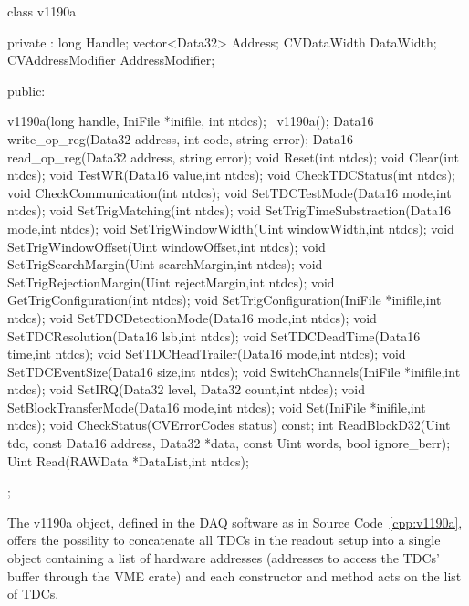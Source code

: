 	\begin{code}
    \begin{cppcode}
class v1190a
{
 private :
    long              Handle;
    vector<Data32>    Address;
    CVDataWidth       DataWidth;
    CVAddressModifier AddressModifier;

 public:

    v1190a(long handle, IniFile *inifile, int ntdcs);
    ~v1190a();
    Data16 write_op_reg(Data32 address, int code, string error);
    Data16 read_op_reg(Data32 address, string error);
    void   Reset(int ntdcs);
    void   Clear(int ntdcs);
    void   TestWR(Data16 value,int ntdcs);
    void   CheckTDCStatus(int ntdcs);
    void   CheckCommunication(int ntdcs);
    void   SetTDCTestMode(Data16 mode,int ntdcs);
    void   SetTrigMatching(int ntdcs);
    void   SetTrigTimeSubstraction(Data16 mode,int ntdcs);
    void   SetTrigWindowWidth(Uint windowWidth,int ntdcs);
    void   SetTrigWindowOffset(Uint windowOffset,int ntdcs);
    void   SetTrigSearchMargin(Uint searchMargin,int ntdcs);
    void   SetTrigRejectionMargin(Uint rejectMargin,int ntdcs);
    void   GetTrigConfiguration(int ntdcs);
    void   SetTrigConfiguration(IniFile *inifile,int ntdcs);
    void   SetTDCDetectionMode(Data16 mode,int ntdcs);
    void   SetTDCResolution(Data16 lsb,int ntdcs);
    void   SetTDCDeadTime(Data16 time,int ntdcs);
    void   SetTDCHeadTrailer(Data16 mode,int ntdcs);
    void   SetTDCEventSize(Data16 size,int ntdcs);
    void   SwitchChannels(IniFile *inifile,int ntdcs);
    void   SetIRQ(Data32 level, Data32 count,int ntdcs);
    void   SetBlockTransferMode(Data16 mode,int ntdcs);
    void   Set(IniFile *inifile,int ntdcs);
    void   CheckStatus(CVErrorCodes status) const;
    int    ReadBlockD32(Uint tdc, const Data16 address,
               Data32 *data, const Uint words, bool ignore_berr);
    Uint   Read(RAWData *DataList,int ntdcs);
};
    \end{cppcode}
	\label{cpp:v1190a}
	\vspace{5mm}
    \end{code}
	
	The v1190a object, defined in the DAQ software as in Source Code~\ref{cpp:v1190a}, offers the possility to concatenate all TDCs in the readout setup into a single object containing a list of hardware addresses (addresses to access the TDCs' buffer through the VME crate) and each constructor and method acts on the list of TDCs.\\
	
